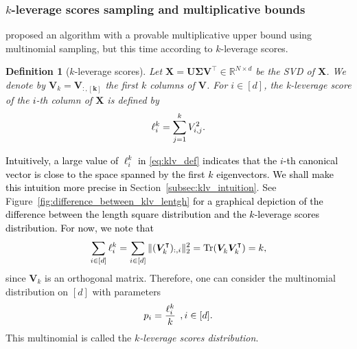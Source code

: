 \documentclass[twoside,11pt]{book}
\newcommand{\rev}[1]{\textcolor{black}{#1}}
\newtheorem{definition}{Definition}
\numberwithin{theorem}{chapter}
\numberwithin{definition}{chapter}
\numberwithin{proposition}{chapter}
\numberwithin{corollary}{chapter}
\numberwithin{example}{chapter}
\numberwithin{lemma}{chapter}
\numberwithin{assumption}{chapter}
\numberwithin{equation}{chapter}
\numberwithin{figure}{chapter}
\DeclareMathOperator{\Tr}{Tr}
\DeclareMathOperator{\Tran}{\intercal}
\begin{document}
\subsubsection{$k$-leverage scores sampling and multiplicative bounds}
\label{subsec:k-lvs_sampling}
\citet*{DrMaMu07} proposed an algorithm with a provable multiplicative upper bound using multinomial sampling, but this time according to $k$-leverage scores.
\begin{definition}[$k$-leverage scores]
Let $\bm{X} = \bm{U}\bm{\Sigma}\bm{V}^{\Tran} \in\mathbb{R}^{N\times d}$ be the SVD of $\bm{X}$. We denote by $\bm{V}_{k} = \bm{V_{:,[k]}}$ the first $k$ columns of $\bm{V}$. For $i \in [d]$, the k-leverage score of the \rev{$i$}-th column of  $\bm{X}$ is defined by
\begin{equation}\label{eq:klv_def}
 \ell^{k}_{\rev{i}} = \sum\limits_{j = 1}^{k} V_{\rev{i,j}}^{2} .
\end{equation}
\end{definition}
\rev{Intuitively, a large value of $\ell^{k}_{i}$ in \eqref{eq:klv_def} indicates that the $i$-th canonical vector is close to the space spanned by the first $k$ eigenvectors. We shall make this intuition more precise in} Section~\ref{subsec:klv_intuition}. See Figure~\ref{fig:difference_between_klv_lentgh} \rev{for a graphical depiction of the difference between the length square distribution and the $k$-leverage scores distribution.
For now, we note that}
\begin{equation}
\sum\limits_{\rev{i \in [d]}} \ell^{k}_{\rev{i}} = \sum\limits_{\rev{i \in [d]}} \| (\bm{V}_{k}^{\Tran})_{\rev{:,i}}\|_{2}^{2}= \Tr(\bm{V}^{}_{k}\bm{V}^{\Tran}_{k}) = k,
\end{equation}
since $\bm{V}^{}_{k}$ is an orthogonal matrix. Therefore, one can consider the multinomial distribution on $[d]$ with parameters
\begin{equation}
p_{\rev{i}} = \frac{\ell^{k}_{\rev{i}}}{k} \:\: , \rev{i} \in [d].
\end{equation}
This multinomial is called the \emph{$k$-leverage scores distribution}.
\end{document}
